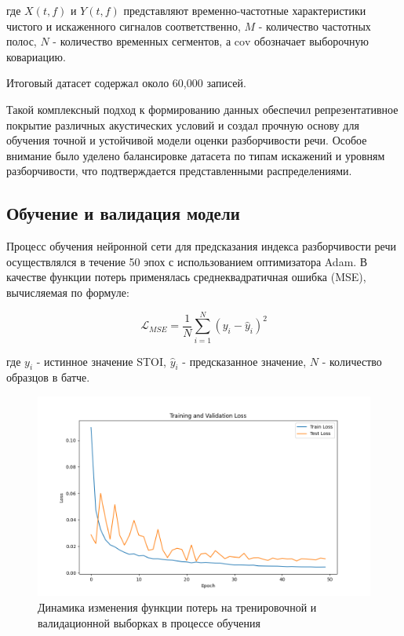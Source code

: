 \documentclass[oneside, final, 14pt]{extarticle}
\begin{document}
где $X(t,f)$ и $Y(t,f)$ представляют временно-частотные характеристики чистого и искаженного сигналов соответственно, $M$ - количество частотных полос, $N$ - количество временных сегментов, а $\text{cov}$ обозначает выборочную ковариацию.

Итоговый датасет содержал около 60,000 записей.


Такой комплексный подход к формированию данных обеспечил репрезентативное покрытие различных акустических условий и создал прочную основу для обучения точной и устойчивой модели оценки разборчивости речи. Особое внимание было уделено балансировке датасета по типам искажений и уровням разборчивости, что подтверждается представленными распределениями.

\subsection{Обучение и валидация модели}

Процесс обучения нейронной сети для предсказания индекса разборчивости речи осуществлялся в течение 50 эпох с использованием оптимизатора Adam. В качестве функции потерь применялась среднеквадратичная ошибка (MSE), вычисляемая по формуле:

\begin{equation}
\mathcal{L}_{MSE} = \frac{1}{N}\sum_{i=1}^N(y_i - \hat{y}_i)^2
\end{equation}

где $y_i$ - истинное значение STOI, $\hat{y}_i$ - предсказанное значение, $N$ - количество образцов в батче.

\begin{figure}[]
\centering
\includegraphics[width=1\linewidth]{training_curve.png}
\caption{Динамика изменения функции потерь на тренировочной и валидационной выборках в процессе обучения}
\label{fig:training_curve}
\end{figure}
\end{document}
